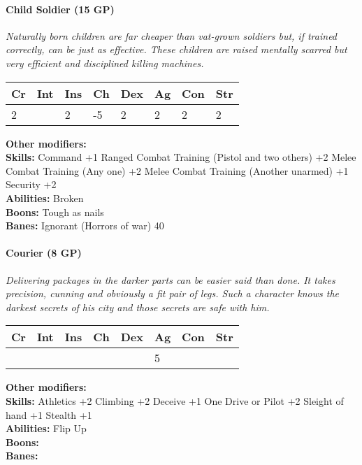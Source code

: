\documentclass[12pt,a4paper,openany]{book}
\begin{document}
	\paragraph*{Child Soldier (15 GP)}
	\textit{Naturally born children are far cheaper than vat-grown soldiers but, if trained correctly, can be just as effective. These children are raised mentally scarred but very efficient and disciplined killing machines.}\par
	\begin{tabular}{|l|l|l|l|l|l|l|l|}
		\hline
		Cr & Int & Ins & Ch & Dex & Ag & Con & Str \\ \hline
		2 &  & 2 & -5 & 2 & 2 & 2 & 2 \\ \hline
	\end{tabular}\par
	\noindent\textbf{Other modifiers:} \\
	\textbf{Skills:} Command +1
	Ranged Combat Training (Pistol and two others) +2
	Melee Combat Training (Any one) +2
	Melee Combat Training (Another unarmed) +1
	Security +2\\
	\textbf{Abilities:} Broken\\
	\textbf{Boons:} Tough as nails\\
	\textbf{Banes:} Ignorant (Horrors of war) 40\\
	
	\hrulefill
	\paragraph*{Courier (8 GP)}
	\textit{Delivering packages in the darker parts can be easier said than done. It takes precision, cunning and obviously a fit pair of legs. Such a character knows the darkest secrets of his city and those secrets are safe with him.}\par
	\begin{tabular}{|l|l|l|l|l|l|l|l|}
		\hline
		Cr & Int & Ins & Ch & Dex & Ag & Con & Str \\ \hline
		&  &  &  &  & 5 &  &  \\ \hline
	\end{tabular}\par
	\noindent\textbf{Other modifiers:} \\
	\textbf{Skills:} Athletics +2
	Climbing +2
	Deceive +1
	One Drive or Pilot +2
	Sleight of hand +1
	Stealth +1\\
	\textbf{Abilities:} Flip Up\\
	\textbf{Boons:} \\
	\textbf{Banes:} \\
	
\end{document}
